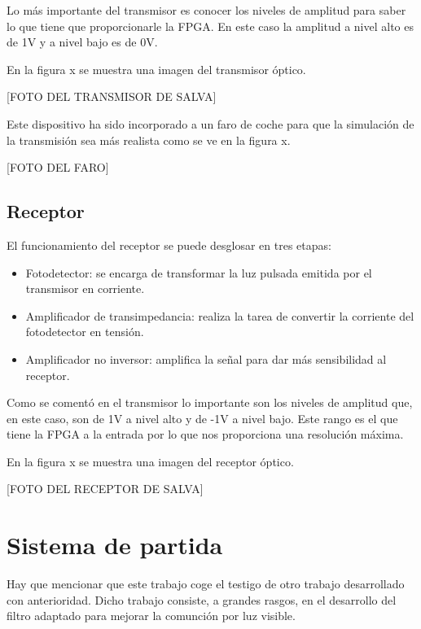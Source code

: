 Lo más importante del transmisor es conocer los niveles de amplitud para saber lo que 
tiene que proporcionarle la FPGA. En este caso la amplitud a nivel alto es de 1V y a nivel 
bajo es de 0V. 

En la figura x se muestra una imagen del transmisor óptico.

[FOTO DEL TRANSMISOR DE SALVA]

Este dispositivo ha sido incorporado a un faro de coche para que la simulación de la 
transmisión sea más realista como se ve en la figura x.

[FOTO DEL FARO]

\subsection{Receptor}
El funcionamiento del receptor se puede desglosar en tres etapas:
\begin{itemize}
    \item Fotodetector: se encarga de transformar la luz pulsada emitida por el transmisor
    en corriente.
    \item Amplificador de transimpedancia: realiza la tarea de convertir la corriente del 
    fotodetector en tensión.
    \item Amplificador no inversor: amplifica la señal para dar más sensibilidad al 
    receptor.
\end{itemize}

Como se comentó en el transmisor lo importante son los niveles de amplitud que, en este 
caso, son de 1V a nivel alto y de -1V a nivel bajo. Este rango es el que tiene la 
FPGA a la entrada por lo que nos proporciona una resolución máxima.

En la figura x se muestra una imagen del receptor óptico.

[FOTO DEL RECEPTOR DE SALVA]

\section{Sistema de partida}
Hay que mencionar que este trabajo coge el testigo de otro trabajo desarrollado con
anterioridad. Dicho trabajo consiste, a grandes rasgos, en el desarrollo del filtro 
adaptado para mejorar la comunción por luz visible. 


